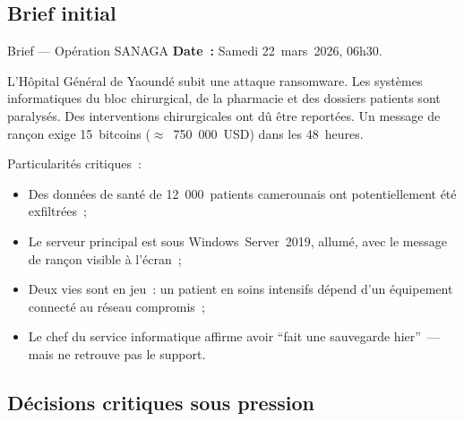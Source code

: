 \subsection{Brief initial}

\begin{boxscenario}{Brief --- Opération SANAGA}
\textbf{Date~:} Samedi 22~mars~2026, 06h30.

L'Hôpital Général de Yaoundé subit une attaque ransomware.
Les systèmes informatiques du bloc chirurgical, de la pharmacie
et des dossiers patients sont paralysés. Des interventions
chirurgicales ont dû être reportées. Un message de rançon
exige 15~bitcoins ($\approx$~750~000~USD) dans les 48~heures.

Particularités critiques~:
\begin{itemize}
    \item Des données de santé de 12~000~patients camerounais
          ont potentiellement été exfiltrées~;
    \item Le serveur principal est sous Windows~Server~2019,
          allumé, avec le message de rançon visible à l'écran~;
    \item Deux vies sont en jeu~: un patient en soins intensifs
          dépend d'un équipement connecté au réseau compromis~;
    \item Le chef du service informatique affirme avoir ``fait
          une sauvegarde hier''~--- mais ne retrouve pas le support.
\end{itemize}
\end{boxscenario}

\subsection{Décisions critiques sous pression}

